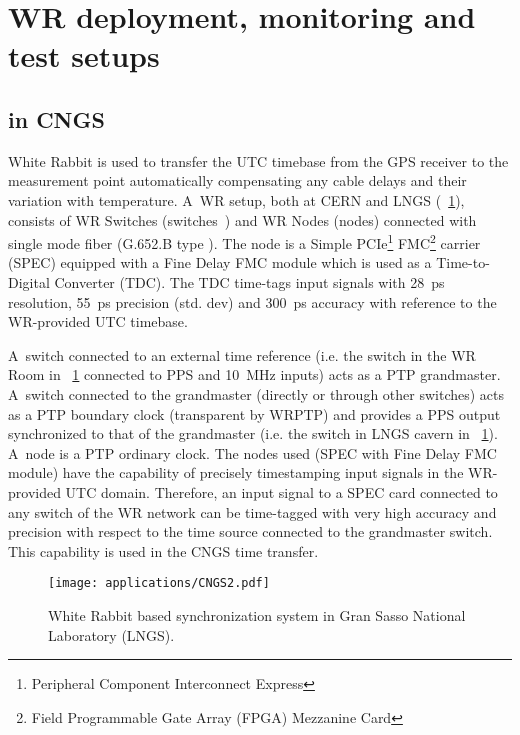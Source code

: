 \section{WR deployment, monitoring and test setups}
\label{sec:deplAndMeas}
\subsection{ in CNGS} 

White Rabbit is used to transfer the UTC timebase from the GPS receiver to the 
measurement point automatically compensating any cable delays and their variation with temperature. 
A~WR setup, both at CERN and LNGS (\figurename~\ref{fig:wrLNGStiming}), consists of WR Switches 
(switches~\cite{biblio:WRswitch}) 
and WR Nodes (nodes) connected with single mode fiber (G.652.B type \cite{biblio:Draka}). %
The node is a Simple PCIe\footnote{Peripheral Component Interconnect Express} 
FMC\footnote{Field Programmable Gate Array (FPGA) Mezzanine Card} carrier (SPEC) \cite{biblio:spec}
equipped with a Fine Delay FMC module \cite{biblio:fineDelay} which is used as 
a Time-to-Digital Converter (TDC). The TDC time-tags input signals with 28~ps 
resolution, 55~ps precision (std. dev) and 300~ps accuracy \cite{biblio:fineDelay}
with reference to the WR-provided UTC timebase.

A~switch connected to an external time reference (i.e. the switch in the WR Room in 
\figurename~\ref{fig:wrLNGStiming} connected to PPS and 10~MHz inputs) acts as a 
PTP grandmaster. A~switch connected to the grandmaster (directly or through other switches) 
acts as a PTP boundary clock (transparent  by WRPTP)
and provides a PPS output synchronized to that of the grandmaster (i.e. the switch in LNGS cavern in 
\figurename~\ref{fig:wrLNGStiming}). 
A~node is a PTP ordinary clock. The nodes used (SPEC with Fine Delay FMC module) 
have the capability of precisely timestamping input signals in the WR-provided UTC domain. 
Therefore, an input signal to a SPEC card connected to any switch of the WR network can be 
time-tagged with very high accuracy and precision with respect to the 
time source connected to the grandmaster switch. This capability is used in the CNGS time transfer.

\begin{figure}[!t]
\centering
\texttt{[image: applications/CNGS2.pdf]}
\caption{White Rabbit based synchronization system in Gran Sasso National Laboratory (LNGS).}
\label{fig:wrLNGStiming}
\end{figure}

